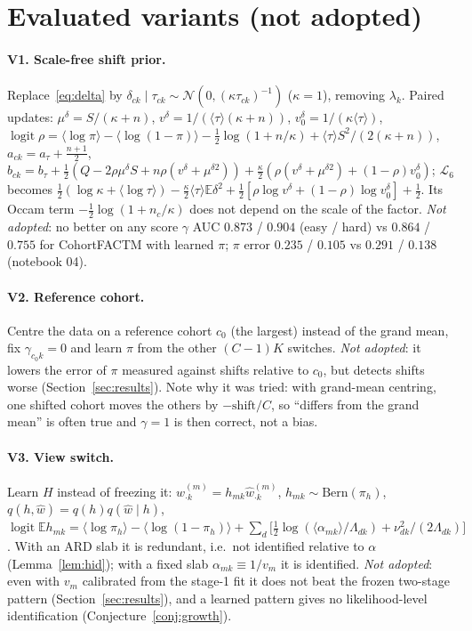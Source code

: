 \documentclass[11pt,a4paper]{article}
\newcommand{\E}{\mathbb{E}}
\newcommand{\N}{\mathcal{N}}
\newcommand{\Bern}{\mathrm{Bern}}
\newcommand{\logit}{\operatorname{logit}}
\newcommand{\ELBO}{\mathcal{L}}
\newcommand{\wh}{\hat w}
\newcommand{\RESCOHORT}{$\gamma$ AUC $0.873$ / $0.904$ (easy / hard) vs $0.864$ / $0.755$ for CohortFACTM with learned $\pi$; $\pi$ error $0.235$ / $0.105$ vs $0.291$ / $0.138$ (notebook 04).}
\theoremstyle{definition}
\theoremstyle{remark}
\begin{document}
\section{Evaluated variants (not adopted)}\label{sec:variants}
\paragraph{V1. Scale-free shift prior.} Replace~\eqref{eq:delta} by $\delta_{ck}\mid\tau_{ck}\sim\N(0,(\kappa\tau_{ck})^{-1})$ ($\kappa=1$),
removing $\lambda_k$. Paired updates: $\mu^\delta=S/(\kappa+n)$, $v^\delta=1/(\langle\tau\rangle(\kappa+n))$, $v^\delta_0=1/(\kappa\langle\tau\rangle)$,
$\logit\rho=\langle\log\pi\rangle-\langle\log(1-\pi)\rangle-\tfrac12\log(1+n/\kappa)+\langle\tau\rangle S^2/(2(\kappa+n))$, $a_{ck}=a_\tau+\tfrac{n+1}2$,
$b_{ck}=b_\tau+\tfrac12(Q-2\rho\mu^\delta S+n\rho(v^\delta+\mu^{\delta2}))+\tfrac\kappa2(\rho(v^\delta+\mu^{\delta2})+(1-\rho)v^\delta_0)$; $\ELBO_6$ becomes
$\tfrac12(\log\kappa+\langle\log\tau\rangle)-\tfrac\kappa2\langle\tau\rangle\E\delta^2+\tfrac12[\rho\log v^\delta+(1-\rho)\log v^\delta_0]+\tfrac12$. Its Occam
term $-\tfrac12\log(1+n_c/\kappa)$ does not depend on the scale of the factor. \emph{Not adopted}: no better on any score
\RESCOHORT

\paragraph{V2. Reference cohort.} Centre the data on a reference cohort $c_0$ (the largest) instead of the grand mean,
fix $\gamma_{c_0k}=0$ and learn $\pi$ from the other $(C-1)K$ switches. \emph{Not adopted}: it lowers the error of $\pi$
measured against shifts relative to $c_0$, but detects shifts worse (Section~\ref{sec:results}). Note why it was tried:
with grand-mean centring, one shifted cohort moves the others by $-\text{shift}/C$, so ``differs from the grand mean'' is
often true and $\gamma=1$ is then correct, not a bias.

\paragraph{V3. View switch.} Learn $H$ instead of freezing it: $w^{(m)}_{\cdot k}=h_{mk}\wh^{(m)}_{\cdot k}$, $h_{mk}\sim\Bern(\pi_h)$,
$q(h,\wh)=q(h)q(\wh\mid h)$,
$\logit\E h_{mk}=\langle\log\pi_h\rangle-\langle\log(1-\pi_h)\rangle+\sum_d\big[\tfrac12\log(\langle\alpha_{mk}\rangle/\Lambda_{dk})+\nu^2_{dk}/(2\Lambda_{dk})\big]$.
With an ARD slab it is redundant, i.e.\ not identified relative to $\alpha$ (Lemma~\ref{lem:hid}); with a fixed slab
$\alpha_{mk}\equiv1/v_m$ it is identified. \emph{Not adopted}: even with $v_m$ calibrated from the stage-1 fit it does not
beat the frozen two-stage pattern (Section~\ref{sec:results}), and a learned pattern gives no likelihood-level
identification (Conjecture~\ref{conj:growth}).
\end{document}
